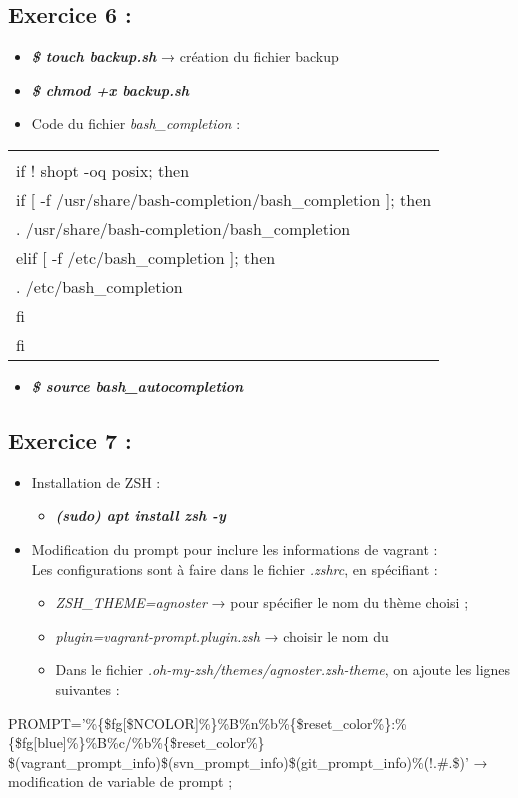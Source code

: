 \documentclass[a4paper]{article}
\begin{document}
\subsection{Exercice 6 : }

	\begin{itemize}
		\item \textbf{\textit{\$ touch backup.sh }}→ création du fichier backup
		\item \textbf{\textit{\$ chmod +x backup.sh}} 
		\item Code du fichier \textit{bash\_completion} : 
	\end{itemize}
	\begin{tabular}{|l|}
		\hline
			\hfill \break \\
			if ! shopt -oq posix; then \\
  			if [ -f /usr/share/bash-completion/bash\_completion ]; then \\
    				. /usr/share/bash-completion/bash\_completion \\
  			elif [ -f /etc/bash\_completion ]; then \\
    				. /etc/bash\_completion \\
  			fi \\
			fi \\	
		\hline
	\end{tabular}
	\begin{itemize}
		\item \textbf{\textit{\$ source bash\_autocompletion}}
	\end{itemize}
	

\subsection{Exercice 7 : }
	\begin{itemize}
		\item Installation de ZSH :
			\begin{itemize}
				\item \textbf{\textit{(sudo) apt install zsh -y }}
			\end{itemize}
		\item Modification du prompt pour inclure les informations de vagrant : \\
		Les configurations sont à faire dans le fichier \textit{.zshrc}, en spécifiant : 
		\begin{itemize}
		 \item \textit{ZSH\_THEME=agnoster} → pour spécifier le nom du thème choisi ;
		 \item \textit{plugin=vagrant-prompt.plugin.zsh} → choisir le nom du 
		 \item Dans le fichier \textit{.oh-my-zsh/themes/agnoster.zsh-theme}, on ajoute les lignes suivantes : 
		\end{itemize}
	\end{itemize}
	PROMPT='\%\{\$fg[\$NCOLOR]\%\}\%B\%n\%b\%\{\$reset\_color\%\}:\%\{\$fg[blue]\%\}\%B\%c/\%b\%\{\$reset\_color\%\} \$(vagrant\_prompt\_info)\$(svn\_prompt\_info)\$(git\_prompt\_info)\%(!.\#.\$)' → modification de variable de prompt ;
	
\end{document}
